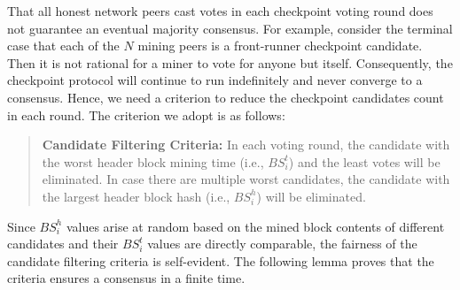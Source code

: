 That all honest network peers cast votes in each checkpoint voting round does not guarantee an eventual majority consensus. For example, consider the terminal case that each of the $N$ mining peers is a front-runner checkpoint candidate. Then it is not rational for a miner to vote for anyone but itself. Consequently, the checkpoint protocol will continue to run indefinitely and never converge to a consensus. Hence, we need a criterion to reduce the checkpoint candidates count in each round. The criterion we adopt is as follows:

\begin{quotation}
\textbf{Candidate Filtering Criteria:} In each voting round, the candidate with the worst header block mining time (i.e., $BS_i^t$) and the least votes will be eliminated. In case there are multiple worst candidates, the candidate with the largest header block hash (i.e., $BS_i^h$) will be eliminated.   
\end{quotation}        

Since $BS_i^h$ values arise at random based on the mined block contents of different candidates and their $BS_i^t$ values are directly comparable, the fairness of the candidate filtering criteria is self-evident. The following lemma proves that the criteria ensures a consensus in a finite time.

